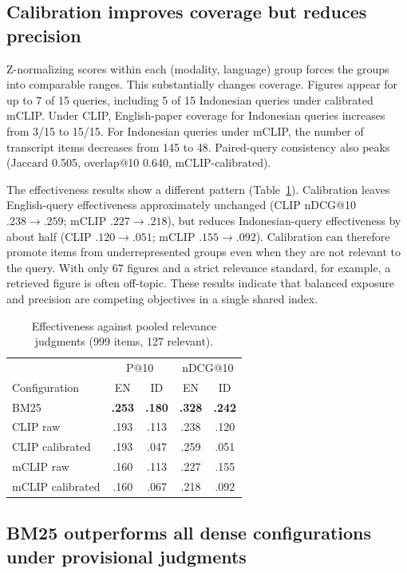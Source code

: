 \documentclass[conference]{IEEEtran}
\begin{document}
\subsection{Calibration improves coverage but reduces precision}

Z-normalizing scores within each (modality, language) group forces the
groups into comparable ranges. This substantially changes coverage. Figures
appear for up to 7 of 15 queries, including 5 of 15 Indonesian queries under
calibrated mCLIP. Under CLIP, English-paper coverage for Indonesian queries
increases from 3/15 to 15/15. For Indonesian queries under mCLIP, the number
of transcript items decreases from 145 to 48. Paired-query
consistency also peaks (Jaccard 0.505, overlap@10 0.640, mCLIP-calibrated).

The effectiveness results show a different pattern (Table~\ref{tab:rel}).
Calibration leaves English-query effectiveness approximately unchanged
(CLIP nDCG@10 $.238 \rightarrow .259$; mCLIP $.227 \rightarrow .218$), but
reduces Indonesian-query effectiveness by about half (CLIP
$.120 \rightarrow .051$; mCLIP $.155 \rightarrow .092$). Calibration can
therefore promote items from underrepresented groups even when they are not
relevant to the query. With only 67 figures and a strict relevance standard,
for example, a retrieved figure is often off-topic. These results indicate
that balanced exposure and precision are competing objectives in a single
shared index.

\begin{table}[t]
\centering
\caption{Effectiveness against pooled relevance judgments
(999 items, 127 relevant).}
\label{tab:rel}
\small
\begin{tabular}{lcccc}
\toprule
 & \multicolumn{2}{c}{P@10} & \multicolumn{2}{c}{nDCG@10}\\
Configuration & EN & ID & EN & ID\\
\midrule
BM25              & \textbf{.253} & \textbf{.180} & \textbf{.328} & \textbf{.242}\\
CLIP raw          & .193 & .113 & .238 & .120\\
CLIP calibrated   & .193 & .047 & .259 & .051\\
mCLIP raw         & .160 & .113 & .227 & .155\\
mCLIP calibrated  & .160 & .067 & .218 & .092\\
\bottomrule
\end{tabular}
\end{table}

\subsection{BM25 outperforms all dense configurations under provisional judgments}
\end{document}
